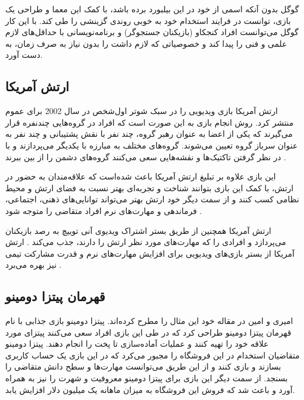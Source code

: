 گوگل بدون آنکه اسمی از خود در این بیلبورد برده باشد، با کمک این معما و طراحی یک بازی، توانست در فرایند استخدام خود به خوبی روندی گزینشی را طی کند. با این کار گوگل می‌توانست افراد کنجکاو (بازیکنان جستجوگر) و برنامه‌نویسانی با حداقل‌های لازم علمی و فنی را پیدا کند و خصوصیاتی که لازم داشت را بدون نیاز به صرف زمان، به دست آورد.

\subsection{ارتش آمریکا}
ارتش آمریکا بازی ویدیویی \href{https://www.americasarmy.com/}{} را  در سبک شوتر اول‌شخص در سال 2002 برای عموم منتشر کرد. روش انجام بازی به این صورت است که افراد در گروه‌هایی چندنفره قرار می‌گیرند که یکی از اعضا به عنوان رهبر گروه، چند نفر با نقش پشتیبانی و چند نفر به عنوان سرباز گروه تعیین می‌شوند. گروه‌های مختلف به مبارزه با یکدیگر می‌پردازند و با در نظر گرفتن تاکتیک‌ها و نقشه‌هایی سعی می‌کنند گروه‌های دشمن را از بین ببرند \cite{eventful}.

این بازی علاوه بر تبلیغ ارتش آمریکا باعث شده‌است که علاقه‌مندان به حضور در ارتش، با کمک این بازی بتوانند شناخت و تجربه‌ای بهتر نسبت به فضای ارتش و محیط نظامی کسب کنند و از سمت دیگر خود ارتش بهتر می‌تواند توانایی‌های ذهنی، اجتماعی، فرماندهی و مهارت‌های نرم افراد متقاضی را متوجه شود \cite{army}.

ارتش آمریکا همچنین از طریق بستر اشتراک ویدیوی آنی توییچ به رصد بازیکنان می‌پردازد و افرادی را که مهارت‌های مورد نظر ارتش را دارند، جذب می‌کند \cite{uhl, cbs}. ارتش آمریکا از بستر بازی‌های ویدیویی برای افزایش مهارت‌های نرم و قدرت مشارکت تیمی نیز بهره می‌برد \cite{cbs}.

\subsection{قهرمان پیتزا دومینو}
امیری و امین \cite{amiriamin} در مقاله خود این مثال را مطرح کرده‌اند. پیتزا دومینو بازی جذابی با نام قهرمان پیتزا دومینو طراحی کرد که در طی این بازی افراد سعی می‌کنند پیتزای مورد علاقه خود را تهیه کنند و عملیات آماده‌سازی تا پخت را انجام دهند. پیتزا دومینو متقاضیان استخدام در این فروشگاه را مجبور می‌کرد که در این بازی یک حساب کاربری بسازند و بازی کنند و از این طریق می‌توانست مهارت‌ها و سطح دانش متقاضی را بسنجد. از سمت دیگر این بازی برای پیتزا دومینو معروفیت و شهرت را نیز به همراه آورد و باعث شد که فروش این فروشگاه به میزان ماهانه یک میلیون دلار افزایش یابد.

